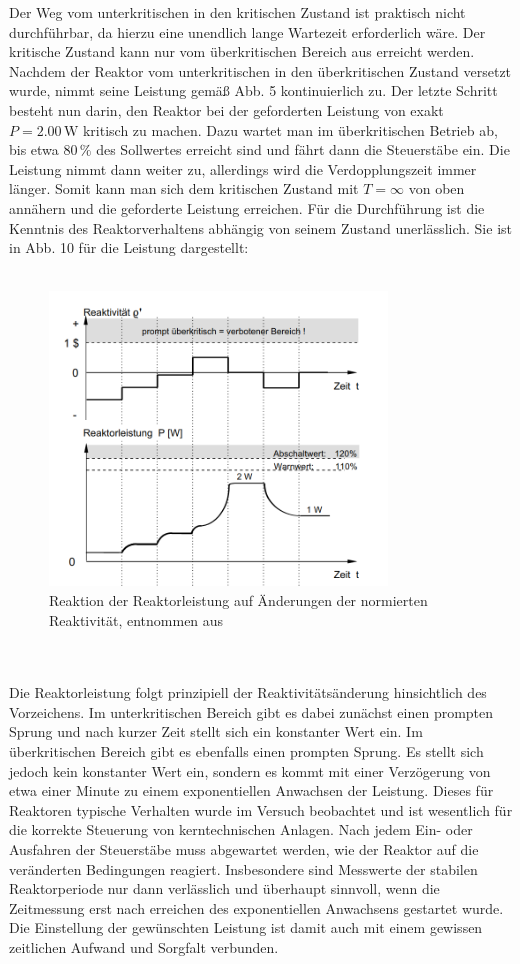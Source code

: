 \documentclass[german,  %
parskip=full,  %
]{scrartcl}
\begin{document}
\newpage
Der Weg vom unterkritischen in den kritischen Zustand ist praktisch nicht durchführbar, da hierzu eine unendlich lange Wartezeit erforderlich wäre. Der kritische Zustand kann nur vom überkritischen Bereich aus erreicht werden.
Nachdem der Reaktor vom unterkritischen in den überkritischen Zustand versetzt wurde, nimmt seine Leistung gemäß Abb. 5 kontinuierlich zu. Der letzte Schritt besteht nun darin, den Reaktor bei der geforderten Leistung von exakt \(P=2.00\,\mathrm{W}\) kritisch zu machen. Dazu wartet man im überkritischen Betrieb ab, bis etwa \(80\,\%\) des Sollwertes erreicht sind und fährt dann die Steuerstäbe ein. Die Leistung nimmt dann weiter zu, allerdings wird die Verdopplungszeit immer länger. Somit kann man sich dem kritischen Zustand mit \(T=\infty\) von oben annähern und die geforderte Leistung erreichen. Für die Durchführung ist die Kenntnis des Reaktorverhaltens abhängig von seinem Zustand unerlässlich. Sie ist in Abb. 10 für die Leistung dargestellt: \\\\
\begin{figure}[h!]\centering
\includegraphics[width=0.8\textwidth]{Reaktion_des_Reaktors.png}
\caption{Reaktion der Reaktorleistung auf Änderungen der normierten Reaktivität, entnommen aus \cite{1}}
\end{figure}
\\\\
Die Reaktorleistung folgt prinzipiell der Reaktivitätsänderung hinsichtlich des Vorzeichens. Im unterkritischen Bereich gibt es dabei zunächst einen prompten Sprung und nach kurzer Zeit stellt sich ein konstanter Wert ein. Im überkritischen Bereich gibt es ebenfalls einen prompten Sprung. Es stellt sich jedoch kein konstanter Wert ein, sondern es kommt mit einer Verzögerung von etwa einer Minute zu einem exponentiellen Anwachsen der Leistung. Dieses für Reaktoren typische Verhalten wurde im Versuch beobachtet und ist wesentlich für die korrekte Steuerung von kerntechnischen Anlagen. Nach jedem Ein- oder Ausfahren der Steuerstäbe muss abgewartet werden, wie der Reaktor auf die veränderten Bedingungen reagiert. Insbesondere sind Messwerte der stabilen Reaktorperiode nur dann verlässlich und überhaupt sinnvoll, wenn die Zeitmessung erst nach erreichen des exponentiellen Anwachsens gestartet wurde. Die Einstellung der gewünschten Leistung ist damit auch mit einem gewissen zeitlichen Aufwand und Sorgfalt verbunden.
\end{document}

